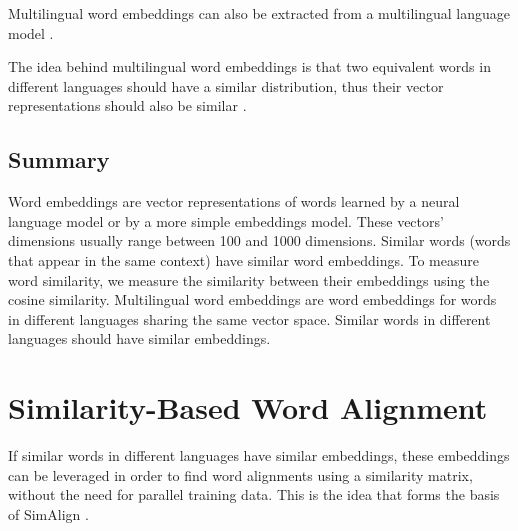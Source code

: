 Multilingual word embeddings can also be extracted from a multilingual language model \autocite{jalili-sabet-etal-2020-simalign}.

The idea behind multilingual word embeddings is that two equivalent words in different languages should have a similar distribution, thus their vector representations should also be similar \autocite{artetxe-etal-2018-robust}. 

\subsection{Summary}
Word embeddings are vector representations of words learned by a neural language model or by a more simple embeddings model. 
These vectors' dimensions usually range between 100 and 1000 dimensions. 
Similar words (words that appear in the same context) have similar word embeddings. 
To measure word similarity, we measure the similarity between their embeddings using the cosine similarity.
Multilingual word embeddings are word embeddings for words in different languages  sharing the same vector space. 
Similar words in different languages should have similar embeddings.

\section{Similarity-Based Word Alignment}



If similar words in different languages have similar embeddings, these embeddings can be  leveraged in order to find word alignments using a similarity matrix, without the need for parallel training data. This is the idea that forms the basis of SimAlign \autocite{jalili-sabet-etal-2020-simalign}.

